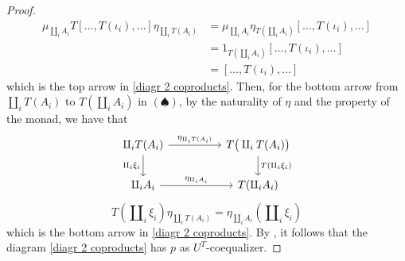 \begin{subbox}{}
\begin{proof}
\begin{align*}
    \mu_{\amalg_iA_i} T[\ldots,T(\iota_i),\ldots] \eta_{\amalg_iT(A_i)} &= \mu_{\amalg_iA_i} \eta_{T(\amalg_iA_i)} [\ldots,T(\iota_i),\ldots] \\[1.5ex]
    &= 1_{T(\amalg_iA_i)} [\ldots,T(\iota_i),\ldots] \\[1.5ex]
    &= [\ldots,T(\iota_i),\ldots] 
\end{align*}
which is the top arrow in \eqref{diagr 2 coproducts}. Then, for the bottom arrow from $\amalg_iT(A_i)$ to $T(\amalg_iA_i)$ in $(\spadesuit)$, by the naturality of $\eta$ and the property of the monad, we have that
\[
\begin{tikzcd}
\amalg_iT(A_i) \arrow[rr, "\eta_{\amalg_iT(A_i)}"] \arrow[d, "\amalg_i\xi_i"'] &  & T\big(\amalg_iT(A_i)\big) \arrow[d, "T(\amalg_i\xi_i)"] \\
\amalg_iA_i \arrow[rr, "\eta_{\amalg_iA_i}"]                                 &  & T(\amalg_iA_i)                                       
\end{tikzcd}
\]
\[
T(\amalg_i\xi_i)\eta_{\amalg_iT(A_i)} = \eta_{\amalg_iA_i}(\amalg_i\xi_i)
\]
which is the bottom arrow in \eqref{diagr 2 coproducts}. By , it follows that the diagram \eqref{diagr 2 coproducts} has $p$ as $U^T$-coequalizer.


\end{proof}
\end{subbox}
